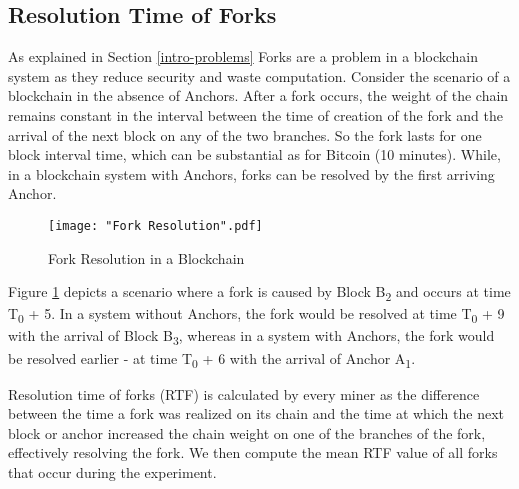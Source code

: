 

\subsection{Resolution Time of Forks} \label{exp-fork}

As explained in Section \ref{intro-problems} Forks are a problem in a blockchain system as they reduce security and waste computation.
Consider the scenario of a blockchain in the absence of Anchors. After a fork occurs, the weight of the chain remains constant in the interval between the time of creation of the fork and the arrival of the next block on any of the two branches. So the fork lasts for one block interval time, which can be substantial as for Bitcoin (10 minutes). 
While, in a blockchain system with Anchors, forks can be resolved by the first arriving Anchor. 


\begin{figure}[!htb]
    \centering
    \texttt{[image: "Fork Resolution".pdf]}
    \caption{Fork Resolution in a Blockchain}
        
    \label{diag-fork-resolution}
\end{figure}

Figure \ref{diag-fork-resolution} depicts a scenario where a fork is caused by Block B\textsubscript{2} and occurs at time T\textsubscript{0} + 5. In a system without Anchors, the fork would be resolved at time T\textsubscript{0} + 9 with the arrival of Block B\textsubscript{3}, whereas in a system with Anchors, the fork would be resolved earlier - at time T\textsubscript{0} + 6 with the arrival of Anchor A\textsubscript{1}.

Resolution time of forks (RTF) is calculated by every miner as the difference between the time a fork was realized on its chain and the time at which the next block or anchor increased the chain weight on one of the branches of the fork, effectively resolving the fork. We then compute the mean RTF value of all forks that occur during the experiment.

